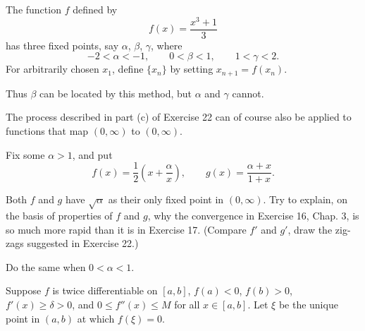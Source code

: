 \begin{questions}

  \question The function $f$ defined by
  \[ f(x) = \frac{x^3+1}{3} \]
  has three fixed points, say $\alpha$, $\beta$, $\gamma$, where
  \[ -2<\alpha<-1, \qquad 0<\beta<1, \qquad 1<\gamma<2. \]
  For arbitrarily chosen $x_1$, define $\{x_n\}$ by setting $x_{n+1}=f(x_n)$.

  Thus $\beta$ can be located by this method, but $\alpha$ and $\gamma$ cannot.

  \question The process described in part (c) of Exercise 22 can of course also be applied to functions that map $(0,\infty)$ to $(0,\infty)$.

  Fix some $\alpha>1$, and put
  \[ f(x) = \frac{1}{2}\left( x + \frac{\alpha}{x} \right), \qquad g(x) = \frac{\alpha+x}{1+x}. \]

  Both $f$ and $g$ have $\sqrt{\alpha}$ as their only fixed point in $(0,\infty)$. Try to explain, on the basis of properties of $f$ and $g$, why the convergence in Exercise 16, Chap. 3, is so much more rapid than it is in Exercise 17. (Compare $f'$ and $g'$, draw the zig-zags suggested in Exercise 22.)

  Do the same when $0<\alpha<1$.

  \question Suppose $f$ is twice differentiable on $[a,b]$, $f(a)<0$, $f(b)>0$, $f'(x)\geq\delta>0$, and $0\leq f''(x)\leq M$ for all $x\in[a,b]$. Let $\xi$ be the unique point in $(a,b)$ at which $f(\xi)=0$.


\end{questions}
